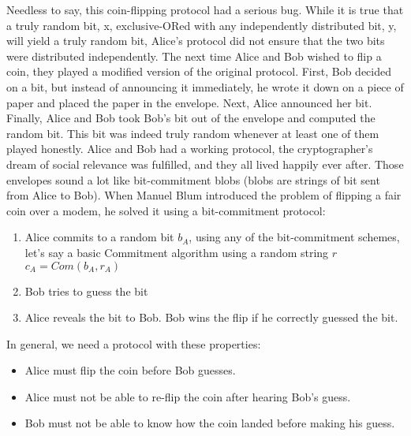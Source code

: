 \documentclass{article}
\begin{document}
\newline Needless to say, this coin-flipping protocol had a serious bug. While it is true that a truly random bit, x, exclusive-ORed with any independently distributed bit, y, will yield a truly random bit,
Alice’s protocol did not ensure that the two bits were distributed
independently.
\newline The next time Alice and Bob wished to flip a coin, they played a modified version of the original protocol. First, Bob decided on a
bit, but instead of announcing it immediately, he wrote it down on
a piece of paper and placed the paper in the envelope. Next, Alice
announced her bit. Finally, Alice and Bob took Bob’s bit out of
the envelope and computed the random bit. This bit was indeed
truly random whenever at least one of them played honestly.
Alice and Bob had a working protocol, the cryptographer’s dream
of social relevance was fulfilled, and they all lived happily ever
after.
Those envelopes sound a lot like bit-commitment blobs (blobs are strings of bit sent from Alice to Bob). When Manuel Blum
introduced the problem of flipping a fair coin over a modem, he solved it
using a bit-commitment protocol:
\begin{enumerate}
    \item Alice commits to a random bit $b_A$, using any of the bit-commitment schemes, let's say a basic Commitment algorithm using a random string $r$ \rightarrow $c_A=Com(b_A, r_A)$
    \item Bob tries to guess the bit
    \item Alice reveals the bit to Bob. Bob wins the flip if he correctly guessed the bit.
\end{enumerate}
 
In general, we need a protocol with these properties:
\begin{itemize}
    \item Alice must flip the coin before Bob guesses.
    \item Alice must not be able to re-flip the coin after hearing Bob’s guess.
    \item Bob must not be able to know how the coin landed before making his guess.
\end{itemize}
\end{document}
